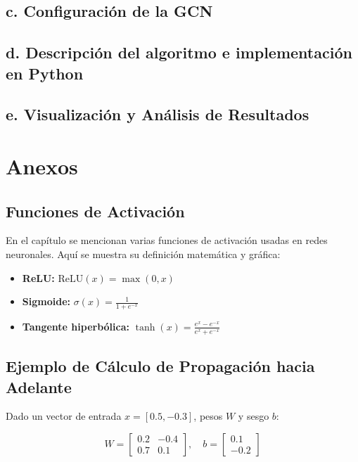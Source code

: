 \documentclass[11pt]{article} %
\begin{document}
\subsection{c. Configuración de la GCN} 



\subsection*{d. Descripción del algoritmo e implementación en Python}



\subsection*{e. Visualización y Análisis de Resultados}




\newpage
\nocite{*}
\printbibliography
\newpage 
\section{Anexos}
\vspace{10pt}

\subsection{Funciones de Activación}
En el capítulo se mencionan varias funciones de activación usadas en redes neuronales. Aquí se muestra su definición matemática y gráfica:

\begin{itemize}
    \item \textbf{ReLU:} \(\text{ReLU}(x) = \max(0, x)\)
    \item \textbf{Sigmoide:} \(\sigma(x) = \frac{1}{1 + e^{-x}}\)
    \item \textbf{Tangente hiperbólica:} \(\tanh(x) = \frac{e^{x} - e^{-x}}{e^{x} + e^{-x}}\)
\end{itemize}

\vspace{10pt}

\subsection{Ejemplo de Cálculo de Propagación hacia Adelante}
Dado un vector de entrada \(x = [0.5, -0.3]\), pesos \(W\) y sesgo \(b\):

\[
W = \begin{bmatrix}
0.2 & -0.4 \\
0.7 & 0.1 
\end{bmatrix}, \quad
b = \begin{bmatrix}
0.1 \\
-0.2
\end{bmatrix}
\]
\end{document}
